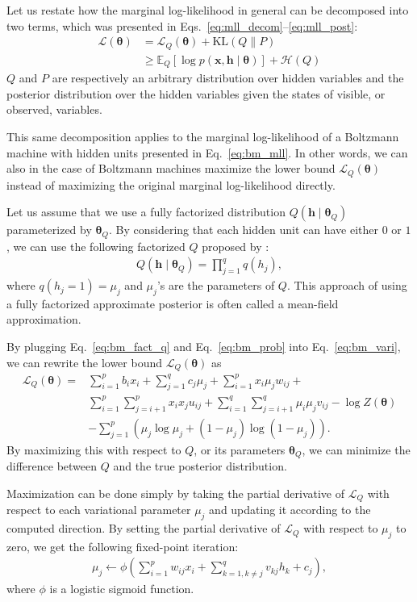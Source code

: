 \documentclass[dissertation,nocontribution]{aaltoseries}
\newcommand{\vect}[1]{\mathbf{#1}}
\newcommand{\vects}[1]{\boldsymbol{#1}}
\newcommand{\vh}[0]{\vect{h}}
\newcommand{\vx}[0]{\vect{x}}
\newcommand{\TT}[0]{{\vects{\theta}}}
\newcommand{\LL}[0]{\mathcal{L}}
\newcommand{\HH}[0]{\mathcal{H}}
\newcommand{\KL}[0]{\text{KL}}
\newcommand{\E}[0]{\mathbb{E}}
\begin{document}
Let us 
restate how the marginal log-likelihood in
general can be decomposed into two terms, which was
presented in Eqs.~\eqref{eq:mll_decom}--\eqref{eq:mll_post}:
\begin{align}
    \label{eq:bm_vari}
    \LL(\TT) &= \LL_Q(\TT) + \KL(Q \| P) 
    \nonumber
    \\
    &\geq 
    \E_{Q} \left[ \log p(\vx, \vh \mid
    \TT)\right] + \HH(Q)
\end{align}
$Q$ and $P$ are respectively an arbitrary distribution
over hidden variables and the posterior distribution over
the hidden variables given the states of visible, or
observed, variables.

This same decomposition applies to the marginal
log-likelihood of a Boltzmann machine with hidden units
presented in Eq.~\eqref{eq:bm_mll}. In other words, we can
also in the case of Boltzmann machines maximize the
lower bound $\LL_Q(\TT)$ instead of maximizing the original
marginal log-likelihood directly.

Let us assume that we use a fully factorized distribution
$Q(\vh \mid \TT_Q)$ parameterized by $\TT_Q$. By considering
that each hidden unit can have either $0$ or $1$, we can use
the following factorized $Q$ proposed by
\citet{Salakhutdinov2009}:
\begin{align}
    \label{eq:bm_fact_q}
    Q(\vh \mid \TT_Q) = \prod_{j=1}^q q(h_j),
\end{align}
where $q(h_j = 1) = \mu_j$ and $\mu_j$'s are the parameters
of $Q$. This approach of using a fully factorized
approximate posterior is often called a mean-field approximation.

By plugging Eq.~\eqref{eq:bm_fact_q} and
Eq.~\eqref{eq:bm_prob} into Eq.~\eqref{eq:bm_vari}, we can
rewrite the lower bound $\LL_Q(\TT)$ as
\begin{align}
    \label{eq:bm_lowerbound}
    \LL_Q(\TT) =& \sum_{i=1}^p b_i x_i + \sum_{j=1}^q c_j
    \mu_j + \sum_{i=1}^p x_i \mu_j w_{ij} + 
    \nonumber \\ 
    & \sum_{i=1}^p \sum_{j=i+1}^p x_i x_j u_{ij} +
    \sum_{i=1}^q \sum_{j=i+1}^q \mu_i \mu_j v_{ij} -\log
    Z(\TT) 
    \nonumber \\
    & - \sum_{j=1}^p \left( \mu_j \log \mu_j + (1
    - \mu_j) \log (1 - \mu_j)
    \right).
\end{align}
By maximizing this with respect to $Q$, or its
parameters $\TT_Q$, we can minimize the difference between
$Q$ and the true posterior distribution. 

Maximization can be done simply by taking the
partial derivative of $\LL_Q$ with respect to each variational
parameter $\mu_j$ and updating it according to the computed
direction. By setting the partial derivative of $\LL_Q$ with
respect to $\mu_j$ to zero, we get the following fixed-point
iteration:
\begin{align}
    \label{eq:vari_update}
    \mu_j \leftarrow \phi\left(\sum_{i=1}^p w_{ij} x_i +
    \sum_{k=1, k\neq j}^q v_{kj} h_k + c_j\right),
\end{align}
where $\phi$ is a logistic sigmoid function.
\end{document}
